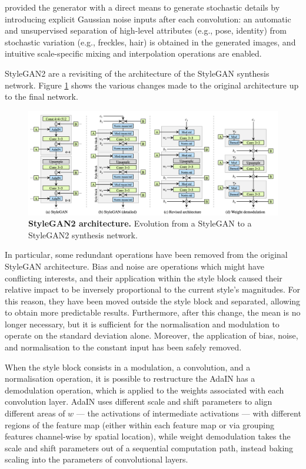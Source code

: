 \documentclass{article}
\begin{document}
	\citet{karras2019style} provided the generator with a direct means to generate stochastic 
	details by 
	introducing explicit Gaussian noise inputs after each convolution: an automatic and 
	unsupervised 
	separation of high-level attributes (e.g., pose, identity) from stochastic variation (e.g., 
	freckles, hair) 
	is obtained in the generated images, and intuitive scale-specific mixing and interpolation 
	operations 
	are enabled.
	
	StyleGAN2 \cite{karras2020analyzing} are a revisiting of the architecture of the StyleGAN synthesis 
	network. Figure \ref{fig:StyleGAN2} shows the various changes made to the original architecture up 
	to the final network.
	\begin{figure}[htb]				
		\centering
		\includegraphics[width=.9\linewidth]{images/StyleGAN2}
		\caption{\textbf{StyleGAN2 architecture.} Evolution from a StyleGAN to a StyleGAN2 synthesis 
			network.}
		\label{fig:StyleGAN2}
	\end{figure}
	
	In particular, some redundant operations have been removed from the original StyleGAN architecture.
	Bias and noise are operations which might have conflicting interests, and their application within the 
	style block caused their relative impact to be inversely proportional to the current style’s 
	magnitudes. For this reason, they have been moved outside the style block and separated, allowing 
	to obtain more predictable results.
	Furthermore, after this change, the mean is no longer necessary, but it is sufficient for the 
	normalisation and modulation to operate on the standard deviation alone.
	Moreover, the application of bias, noise, and normalisation to the constant input has been safely 
	removed. 
	
	When the style block consists in a modulation, a convolution, and a normalisation operation, it is 
	possible to restructure the AdaIN has a demodulation operation, which is applied to the weights 
	associated with each convolution layer. 
	AdaIN uses different scale and shift parameters to align different areas of $w$ — the activations 
	of intermediate activations — with different regions of the feature map (either within each feature 
	map or via grouping features channel-wise by spatial location), while weight demodulation takes the 
	scale and shift parameters out of a sequential computation path, instead baking scaling into the 
	parameters of convolutional layers.
	
\end{document}
